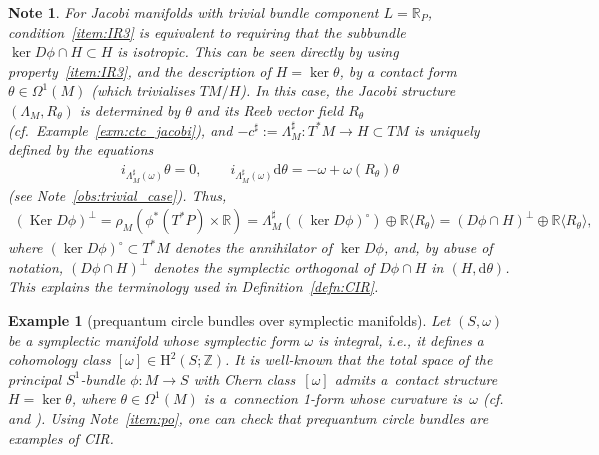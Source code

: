 \documentclass[pdftex]{sigma}
\numberwithin{equation}{section}
\newtheorem{Note}[Theorem]{Note}
\newtheorem{Example}[Theorem]{Example}
\newcommand{\Ker}{\operatorname{Ker}} %
\newcommand{\de}{\mathrm{d}} %
\newcommand{\SM}{(S,\omega)} %
\newcommand{\HH}{\mathrm{H}}
\newcommand{\RR}{\mathbb{R}}
\newcommand{\ZZ}{\mathbb{Z}}
\begin{document}
\begin{Note}\label{item:po} For Jacobi manifolds with trivial bundle component $L=\RR_P$, condition~\ref{item:IR3} is equivalent to requiring that the subbundle $ \ker D\phi \cap H\subset H$ is isotropic. This can be seen directly by using property~\ref{item:IR3}, and the description of $H=\ker\theta$, by a contact form $\theta\in\Omega^1(M)$ (which trivialises $TM/H$). In this case, the Jacobi structure $(\Lambda_M, R_{\theta})$ is determined by $\theta$ and its Reeb vector f\/ield $R_{\theta}$ (cf.\ Example~\ref{exm:ctc_jacobi}), and $-c^\sharp:=\Lambda_M^\sharp\colon T^*M\to H\subset TM$ is uniquely def\/ined by the equations
 \begin{gather*}i_{\Lambda_M^\sharp(\omega)}\theta=0,\qquad i_{\Lambda_M^\sharp(\omega)}\de\theta=-\omega+\omega(R_{\theta})\theta\end{gather*}
 (see Note~\eqref{obs:trivial_case}). Thus,
 \begin{gather*}(\Ker D\phi)^{\perp}=\rho_M(\phi^*(T^*P)\times\RR)=\Lambda_M^\sharp((\ker
 D\phi)^\circ)\oplus \RR \langle R_{\theta} \rangle=(D\phi \cap H)^{\perp}\oplus \RR \langle R_{\theta} \rangle, \end{gather*}
where $(\ker D\phi)^\circ\subset T^*M$ denotes the annihilator of $\ker D\phi$, and, by abuse of notation, $(D\phi \cap H)^{\perp}$ denotes the symplectic orthogonal of $D\phi \cap H$ in $(H,\de\theta)$. This explains the terminology used in Def\/inition~\ref{defn:CIR}.
\end{Note}

\begin{Example}[prequantum circle bundles over symplectic manifolds]\label{sec:motiv-preq-circle} Let $\SM$ be a symplectic manifold whose symplectic form $\omega$ is {\it integral}, i.e., it def\/ines a cohomology class $[\omega] \in \HH^2(S;\ZZ)$. It is well-known that the total space of the principal $S^1$-bundle $\phi \colon M \to S$ with Chern class~$[\omega]$ admits a~contact structure $H = \ker \theta$, where $\theta \in \Omega^1(M)$ is a~connection 1-form whose curvature is~$\omega$ (cf.\ \cite[Section~7.2]{geiges_book} and \cite[Example~3.48]{mcduff_salamon}). Using Note~\eqref{item:po}, one can check that prequantum circle bundles are examples of CIR.
\end{Example}
\end{document}
